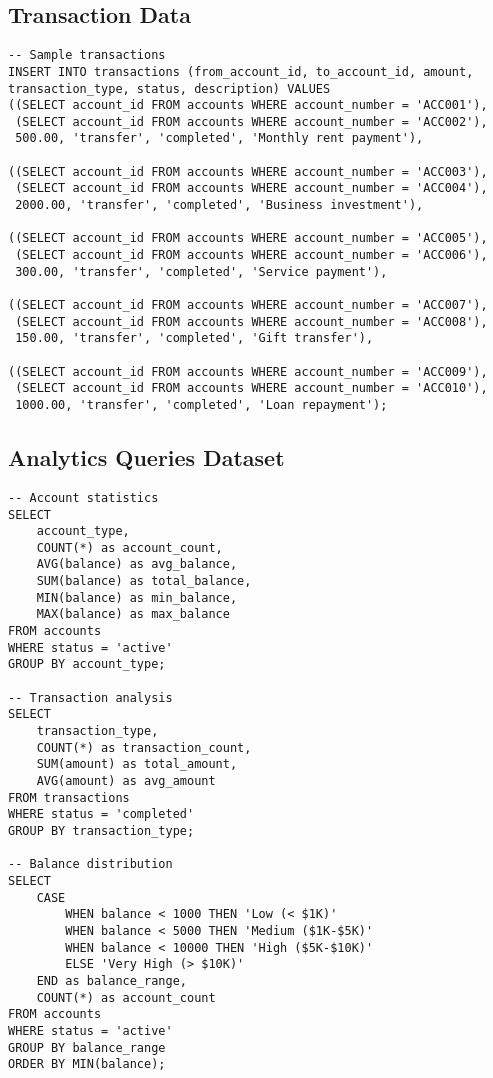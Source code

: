 \subsection{Transaction Data}

\begin{verbatim}
-- Sample transactions
INSERT INTO transactions (from_account_id, to_account_id, amount, transaction_type, status, description) VALUES
((SELECT account_id FROM accounts WHERE account_number = 'ACC001'),
 (SELECT account_id FROM accounts WHERE account_number = 'ACC002'),
 500.00, 'transfer', 'completed', 'Monthly rent payment'),

((SELECT account_id FROM accounts WHERE account_number = 'ACC003'),
 (SELECT account_id FROM accounts WHERE account_number = 'ACC004'),
 2000.00, 'transfer', 'completed', 'Business investment'),

((SELECT account_id FROM accounts WHERE account_number = 'ACC005'),
 (SELECT account_id FROM accounts WHERE account_number = 'ACC006'),
 300.00, 'transfer', 'completed', 'Service payment'),

((SELECT account_id FROM accounts WHERE account_number = 'ACC007'),
 (SELECT account_id FROM accounts WHERE account_number = 'ACC008'),
 150.00, 'transfer', 'completed', 'Gift transfer'),

((SELECT account_id FROM accounts WHERE account_number = 'ACC009'),
 (SELECT account_id FROM accounts WHERE account_number = 'ACC010'),
 1000.00, 'transfer', 'completed', 'Loan repayment');
\end{verbatim}

\subsection{Analytics Queries Dataset}

\begin{verbatim}
-- Account statistics
SELECT
    account_type,
    COUNT(*) as account_count,
    AVG(balance) as avg_balance,
    SUM(balance) as total_balance,
    MIN(balance) as min_balance,
    MAX(balance) as max_balance
FROM accounts
WHERE status = 'active'
GROUP BY account_type;

-- Transaction analysis
SELECT
    transaction_type,
    COUNT(*) as transaction_count,
    SUM(amount) as total_amount,
    AVG(amount) as avg_amount
FROM transactions
WHERE status = 'completed'
GROUP BY transaction_type;

-- Balance distribution
SELECT
    CASE
        WHEN balance < 1000 THEN 'Low (< $1K)'
        WHEN balance < 5000 THEN 'Medium ($1K-$5K)'
        WHEN balance < 10000 THEN 'High ($5K-$10K)'
        ELSE 'Very High (> $10K)'
    END as balance_range,
    COUNT(*) as account_count
FROM accounts
WHERE status = 'active'
GROUP BY balance_range
ORDER BY MIN(balance);
\end{verbatim}

